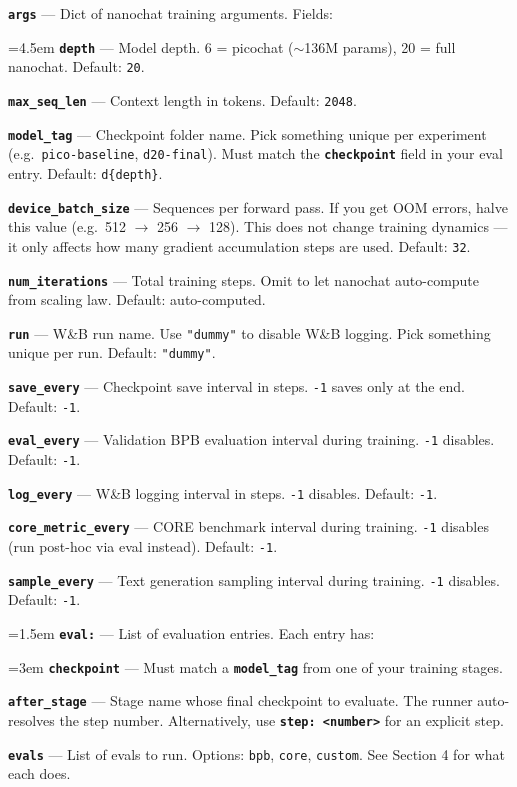 \documentclass[9pt]{extarticle}
\newcommand{\cmd}[1]{\colorbox{gray!10}{\texttt{#1}}}
\newcommand{\field}[1]{\texttt{\textbf{#1}}}
\begin{document}
\field{args} --- Dict of nanochat training arguments. Fields:

\leftskip=4.5em
\field{depth} --- Model depth. 6 = picochat ($\sim$136M params), 20 = full nanochat. Default: \cmd{20}.

\field{max\_seq\_len} --- Context length in tokens. Default: \cmd{2048}.

\field{model\_tag} --- Checkpoint folder name. Pick something unique per experiment (e.g.\ \cmd{pico-baseline}, \cmd{d20-final}). Must match the \field{checkpoint} field in your eval entry. Default: \cmd{d\{depth\}}.

\field{device\_batch\_size} --- Sequences per forward pass. If you get OOM errors, halve this value (e.g.\ 512 $\to$ 256 $\to$ 128). This does not change training dynamics --- it only affects how many gradient accumulation steps are used. Default: \cmd{32}.

\field{num\_iterations} --- Total training steps. Omit to let nanochat auto-compute from scaling law. Default: auto-computed.

\field{run} --- W\&B run name. Use \cmd{"dummy"} to disable W\&B logging. Pick something unique per run. Default: \cmd{"dummy"}.

\field{save\_every} --- Checkpoint save interval in steps. \cmd{-1} saves only at the end. Default: \cmd{-1}.

\field{eval\_every} --- Validation BPB evaluation interval during training. \cmd{-1} disables. Default: \cmd{-1}.

\field{log\_every} --- W\&B logging interval in steps. \cmd{-1} disables. Default: \cmd{-1}.

\field{core\_metric\_every} --- CORE benchmark interval during training. \cmd{-1} disables (run post-hoc via eval instead). Default: \cmd{-1}.

\field{sample\_every} --- Text generation sampling interval during training. \cmd{-1} disables. Default: \cmd{-1}.

\leftskip=1.5em
\vspace{4pt}
\field{eval:} --- List of evaluation entries. Each entry has:

\leftskip=3em
\field{checkpoint} --- Must match a \field{model\_tag} from one of your training stages.

\field{after\_stage} --- Stage name whose final checkpoint to evaluate. The runner auto-resolves the step number. Alternatively, use \field{step: <number>} for an explicit step.

\field{evals} --- List of evals to run. Options: \cmd{bpb}, \cmd{core}, \cmd{custom}. See Section 4 for what each does.
\end{document}
